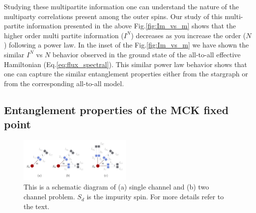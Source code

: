 \documentclass[reprint,prb,superscriptaddress]{revtex4-2}
\begin{document}
\noindent Studying these multipartite information one can understand the nature of the multiparty correlations present among the outer spins. Our study of this multi-partite information presented in the above Fig.\eqref{fig:Im_vs_m} shows that the higher order multi partite information ($I^N$) decreases as you increase the order ($N$) following a power law. In the inset of the Fig.\ref{fig:Im_vs_m} we have shown the similar $I^N$ vs $N$ behavior observed in the ground state of the all-to-all effective Hamiltonian (Eq.\ref{eq:flux_spectral}). This similar power law behavior shows that one can capture the similar entanglement properties either from the stargraph or from the corresponding all-to-all model.





\subsection{Entanglement properties of the MCK fixed point}
\label{sec:EE_excitation}
\begin{figure}[!htpb]
\includegraphics[width=0.49\textwidth]{plt/hopping_fock_states}
\caption{This is a schematic diagram of (a) single channel and (b) two channel problem. $S_d$ is the impurity spin. For more details refer to the text.}
\label{fig:schematic_hopping}
\end{figure}
\end{document}
